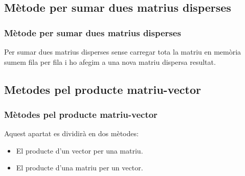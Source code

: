 \documentclass[8pt]{beamer}
\begin{document}
\begin{frame}

\end{frame}

\subsection[Suma]{Mètode per sumar dues matrius disperses}
\begin{frame}
  \frametitle{Mètode per sumar dues matrius disperses}
  Per sumar dues matrius disperses sense carregar tota la matriu en memòria sumem fila per fila i ho afegim a una nova matriu dispersa resultat.
\end{frame}

\begin{frame}

\end{frame}


\subsection[Producte amb vectors]{Metodes pel producte matriu-vector}
\begin{frame}
  \frametitle{Mètodes pel producte matriu-vector}
  Aquest apartat es dividirà en dos mètodes: 
  \begin{itemize}
  \item El producte d'un vector per una matriu.
  \item El producte d'una matriu per un vector.
  \end{itemize}
\end{frame}
\end{document}
